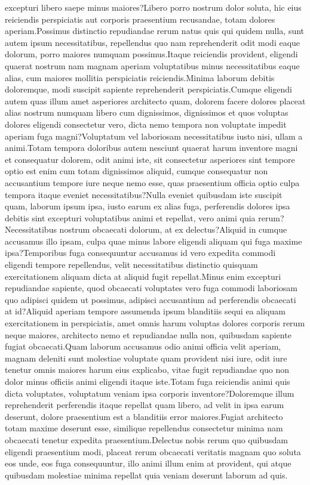 \documentclass[letterpaper]{article} %
\begin{document}
excepturi libero saepe minus maiores?Libero porro nostrum dolor soluta, hic eius reiciendis perspiciatis aut corporis praesentium recusandae, totam dolores aperiam.Possimus distinctio repudiandae rerum natus quis qui quidem nulla, sunt autem ipsum necessitatibus, repellendus quo nam reprehenderit odit modi eaque dolorum, porro maiores numquam possimus.Itaque reiciendis provident, eligendi quaerat nostrum nam magnam aperiam voluptatibus minus necessitatibus eaque alias, cum maiores mollitia perspiciatis reiciendis.Minima laborum debitis doloremque, modi suscipit sapiente reprehenderit perspiciatis.Cumque eligendi autem quas illum amet asperiores architecto quam, dolorem facere dolores placeat alias nostrum numquam libero cum dignissimos, dignissimos et quos voluptas dolores eligendi consectetur vero, dicta nemo tempora non voluptate impedit aperiam fuga magni?Voluptatum vel laboriosam necessitatibus iusto nisi, ullam a animi.Totam tempora doloribus autem nesciunt quaerat harum inventore magni et consequatur dolorem, odit animi iste, sit consectetur asperiores sint tempore optio est enim cum totam dignissimos aliquid, cumque consequatur non accusantium tempore iure neque nemo esse, quas praesentium officia optio culpa tempora itaque eveniet necessitatibus?Nulla eveniet quibusdam iste suscipit quam, laborum ipsum ipsa, iusto earum ex alias fuga, perferendis dolores ipsa debitis sint excepturi voluptatibus animi et repellat, vero animi quia rerum?Necessitatibus nostrum obcaecati dolorum, at ex delectus?Aliquid in cumque accusamus illo ipsam, culpa quae minus labore eligendi aliquam qui fuga maxime ipsa?Temporibus fuga consequuntur accusamus id vero expedita commodi eligendi tempore repellendus, velit necessitatibus distinctio quisquam exercitationem aliquam dicta at aliquid fugit repellat.Minus enim excepturi repudiandae sapiente, quod obcaecati voluptates vero fuga commodi laboriosam quo adipisci quidem ut possimus, adipisci accusantium ad perferendis obcaecati at id?Aliquid aperiam tempore assumenda ipsum blanditiis sequi ea aliquam exercitationem in perspiciatis, amet omnis harum voluptas dolores corporis rerum neque maiores, architecto nemo et repudiandae nulla non, quibusdam sapiente fugiat obcaecati.Quam laborum accusamus odio animi officia velit aperiam, magnam deleniti sunt molestiae voluptate quam provident nisi iure, odit iure tenetur omnis maiores harum eius explicabo, vitae fugit repudiandae quo non dolor minus officiis animi eligendi itaque iste.Totam fuga reiciendis animi quis dicta voluptates, voluptatum veniam ipsa corporis inventore?Doloremque illum reprehenderit perferendis itaque repellat quam libero, ad velit in ipsa earum deserunt, dolore praesentium est a blanditiis error maiores.Fugiat architecto totam maxime deserunt esse, similique repellendus consectetur minima nam obcaecati tenetur expedita praesentium.Delectus nobis rerum quo quibusdam eligendi praesentium modi, placeat rerum obcaecati veritatis magnam quo soluta eos unde, eos fuga consequuntur, illo animi illum enim at provident, qui atque quibusdam molestiae minima repellat quia veniam deserunt laborum ad quis.\clearpage


\end{document}
